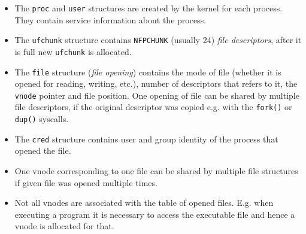 
\begin{slide}
\begin{center}

\end{center}
\end{slide}

\begin{itemize}
\item The \texttt{proc} and \texttt{user} structures are created by the kernel
for each process. They contain service information about the process.
\item The \texttt{ufchunk} structure contains \texttt{NFPCHUNK} (usually 24)
\emph{file descriptors}, after it is full new \texttt{ufchunk} is allocated.
\item The \texttt{file} structure (\emph{file opening}) contains the mode
of file (whether it is opened for reading, writing, etc.), number of descriptors
that refers to it, the \texttt{vnode} pointer and file position.
One opening of file can be shared by multiple file descriptors,
if the original descriptor was copied e.g. with the \texttt{fork()}
or \texttt{dup()} syscalls.
\item The \texttt{cred} structure contains user and group identity of the
process that opened the file.
\item One vnode corresponding to one file can be shared by multiple file
structures if given file was opened multiple times.
\item Not all vnodes are associated with the table of opened files.
E.g. when executing a program it is necessary to access the executable file and
hence a vnode is allocated for that.
\end{itemize}




